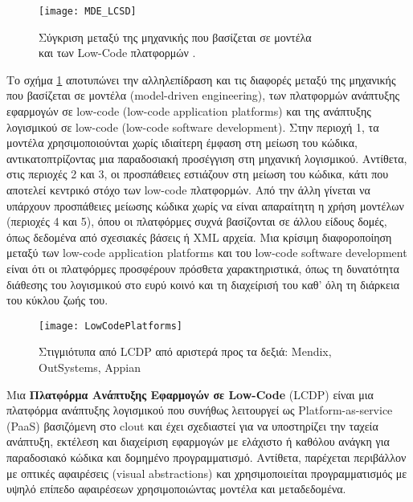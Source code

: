         \begin{figure}[h!] \noindent \centering
            \texttt{[image: MDE\_LCSD]}
            \caption{\centering Σύγκριση μεταξύ της μηχανικής που βασίζεται σε μοντέλα \\ και των Low-Code πλατφορμών \cite{MDELow}.}
            \label{fig:MDE_LCSD}
        \end{figure}

        Το σχήμα \ref{fig:MDE_LCSD} αποτυπώνει την αλληλεπίδραση και τις διαφορές μεταξύ της μηχανικής που βασίζεται σε μοντέλα (model-driven engineering), των πλατφορμών ανάπτυξης εφαρμογών σε low-code (low-code application platforms) και της ανάπτυξης λογισμικού σε low-code (low-code software development). Στην περιοχή 1, τα μοντέλα χρησιμοποιούνται χωρίς ιδιαίτερη έμφαση στη μείωση του κώδικα, αντικατοπτρίζοντας μια παραδοσιακή προσέγγιση στη μηχανική λογισμικού.
        Αντίθετα, στις περιοχές 2 και 3, οι προσπάθειες εστιάζουν στη μείωση του κώδικα, κάτι που αποτελεί κεντρικό στόχο των low-code πλατφορμών. Από την άλλη γίνεται να υπάρχουν προσπάθειες μείωσης κώδικα χωρίς να είναι απαραίτητη η χρήση μοντέλων (περιοχές 4 και 5), όπου οι πλατφόρμες συχνά βασίζονται σε άλλου είδους δομές, όπως δεδομένα από σχεσιακές βάσεις ή XML αρχεία. Μια κρίσιμη διαφοροποίηση μεταξύ των low-code application platforms και του low-code software development είναι ότι οι πλατφόρμες προσφέρουν πρόσθετα χαρακτηριστικά, όπως τη δυνατότητα διάθεσης του λογισμικού στο ευρύ κοινό και τη διαχείρισή του καθ' όλη τη διάρκεια του κύκλου ζωής του.

        \begin{figure}[h!] \noindent \centering
            \texttt{[image: LowCodePlatforms]}
            \caption{Στιγμιότυπα από LCDP από αριστερά προς τα δεξιά: Mendix, OutSystems, Appian \cite{LowCodeMendix}}
            \label{fig:LowCodePlatforms}
        \end{figure}

        Μια \textbf{Πλατφόρμα Ανάπτυξης Εφαρμογών σε Low-Code} (LCDP) είναι μια πλατφόρμα ανάπτυξης λογισμικού που συνήθως λειτουργεί ως Platform-as-service (PaaS) βασιζόμενη στο clout και έχει σχεδιαστεί για να υποστηρίζει την ταχεία ανάπτυξη, εκτέλεση και διαχείριση εφαρμογών με ελάχιστο ή καθόλου ανάγκη για παραδοσιακό κώδικα και δομημένο προγραμματισμό. Αντίθετα, παρέχεται περιβάλλον με οπτικές αφαιρέσεις (visual abstractions) και χρησιμοποιείται προγραμματισμός με υψηλό επίπεδο αφαιρέσεων χρησιμοποιώντας μοντέλα και μεταδεδομένα.

